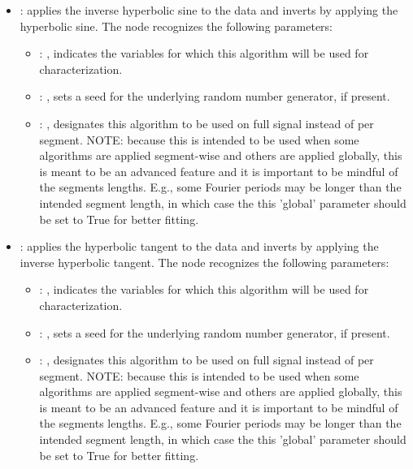 \begin{itemize}
    \item {}:
      applies the inverse hyperbolic sine to the data and inverts by applying
      the hyperbolic sine.
      The  node recognizes the following parameters:
        \begin{itemize}
          \item {}: , 
            indicates the variables for which this algorithm will be used for characterization.
          \item {}: , 
            sets a seed for the underlying random number generator, if present.
          \item {}: , 
            designates this algorithm to be used on full signal instead of per
            segment. NOTE: because this is intended to be used when some algorithms are
            applied segment-wise and others are applied globally, this is meant to be an
            advanced feature and it is important to be mindful of the segments lengths.
            E.g., some Fourier periods may be longer than the intended segment length, in
            which case the this 'global' parameter should be set to True for better
            fitting. 
      \end{itemize}

    \item {}:
      applies the hyperbolic tangent to the data and inverts by applying the
      inverse hyperbolic tangent.
      The  node recognizes the following parameters:
        \begin{itemize}
          \item {}: , 
            indicates the variables for which this algorithm will be used for characterization.
          \item {}: , 
            sets a seed for the underlying random number generator, if present.
          \item {}: , 
            designates this algorithm to be used on full signal instead of per
            segment. NOTE: because this is intended to be used when some algorithms are
            applied segment-wise and others are applied globally, this is meant to be an
            advanced feature and it is important to be mindful of the segments lengths.
            E.g., some Fourier periods may be longer than the intended segment length, in
            which case the this 'global' parameter should be set to True for better
            fitting. 
      \end{itemize}


\end{itemize}
